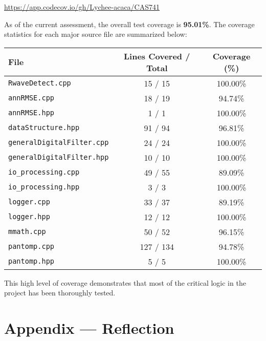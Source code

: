 \documentclass[12pt, titlepage]{article}
\begin{document}
\begin{center}
\url{https://app.codecov.io/gh/Lychee-acaca/CAS741}
\end{center}

As of the current assessment, the overall test coverage is \textbf{95.01\%}. The
coverage statistics for each major source file are summarized below:

\begin{center}
\begin{tabular}{|l|c|c|}
\hline
\textbf{File} & \textbf{Lines Covered / Total} & \textbf{Coverage (\%)} \\
\hline
\texttt{RwaveDetect.cpp}         & 15 / 15    & 100.00\% \\
\texttt{annRMSE.cpp}             & 18 / 19    & 94.74\%  \\
\texttt{annRMSE.hpp}             & 1 / 1      & 100.00\% \\
\texttt{dataStructure.hpp}       & 91 / 94    & 96.81\%  \\
\texttt{generalDigitalFilter.cpp}& 24 / 24    & 100.00\% \\
\texttt{generalDigitalFilter.hpp}& 10 / 10    & 100.00\% \\
\texttt{io\_processing.cpp}       & 49 / 55    & 89.09\%  \\
\texttt{io\_processing.hpp}       & 3 / 3      & 100.00\% \\
\texttt{logger.cpp}              & 33 / 37    & 89.19\%  \\
\texttt{logger.hpp}              & 12 / 12    & 100.00\% \\
\texttt{mmath.cpp}               & 50 / 52    & 96.15\%  \\
\texttt{pantomp.cpp}             & 127 / 134  & 94.78\%  \\
\texttt{pantomp.hpp}             & 5 / 5      & 100.00\% \\
\hline
\end{tabular}
\end{center}

This high level of coverage demonstrates that most of the critical logic in the
project has been thoroughly tested.




\newpage{}
\section*{Appendix --- Reflection}
\end{document}
